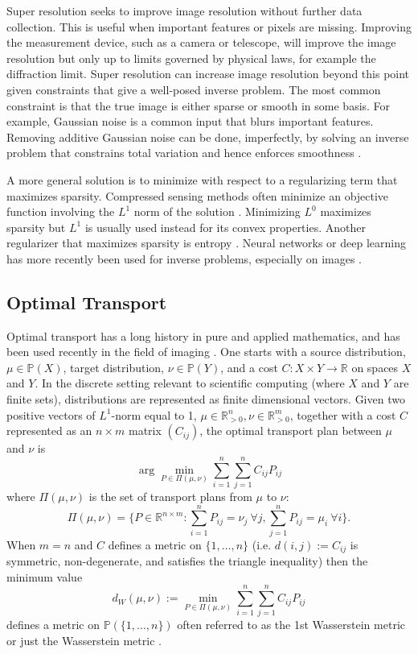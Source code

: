 \documentclass[conference]{IEEEtran}
\newcommand{\R}{{\mathbb{R}}}
\newcommand{\bbP}{{\mathbb{P}}}
\begin{document}
Super resolution seeks to improve image resolution without further data collection. This is useful when important features or pixels are missing. Improving the measurement device, such as a camera or telescope, will improve the image resolution but only up to limits governed by physical laws, for example the diffraction limit. Super resolution can increase image resolution beyond this point given constraints that give a well-posed inverse problem. The most common constraint is that the true image is either sparse or smooth in some basis. For example, Gaussian noise is a common input that blurs important features. Removing additive Gaussian noise can be done, imperfectly, by solving an inverse problem that constrains total variation and hence enforces smoothness \cite{ng}. 

A more general solution is to minimize with respect to a regularizing term that maximizes sparsity. Compressed sensing methods often minimize an objective function 
involving the $L^1$ norm of the solution \cite{candes}. Minimizing $L^0$ maximizes sparsity but $L^1$ is usually used instead for its convex properties. Another regularizer that maximizes sparsity is entropy \cite{gull, cornwell1985}. Neural networks or deep learning has more recently been used for inverse problems, especially on images \cite{ongie}.

\subsection{Optimal Transport}
Optimal transport has a long history in pure and applied mathematics, and has been used recently in the field of imaging \cite{cuturi}. One starts with a source distribution, $\mu\in\bbP(X)$, target distribution, $\nu\in\bbP(Y)$, and a cost $C:X \times Y \rightarrow \R$ on spaces $X$ and $Y$. In the discrete setting relevant to scientific computing (where $X$ and $Y$ are finite sets), distributions are represented as finite dimensional vectors.
Given two positive vectors of $L^1$-norm equal to 1, $\mu\in\R^n_{>0}, \nu \in \R^m_{>0}$, together with a cost $C$ represented as an $n\times m$ matrix $(C_{ij})$, the optimal transport plan between $\mu$ and $\nu$ is 
\begin{equation} \label{eq:OTPlan} 
    \arg\min_{P\in \Pi(\mu,\nu)} \sum_{i=1}^n \sum_{j=1}^n C_{ij} P_{ij} 
\end{equation}
where $\Pi(\mu,\nu)$ is the set of transport plans from $\mu$ to $\nu$:
$$ \Pi(\mu,\nu) = \{P\in\R^{n\times m}: \sum_{i=1}^n P_{ij} = \nu_j\ \forall j, \sum_{j=1}^n P_{ij} = \mu_i\ \forall i\}. $$
When $m=n$ and $C$ defines a metric on $\{1,\ldots,n\}$ (i.e. $d(i,j) := C_{ij}$ is symmetric, non-degenerate, and satisfies the triangle inequality) then the minimum value
\begin{equation} \label{eq:Wdist} 
    d_W(\mu,\nu) := \min_{P\in \Pi(\mu,\nu)} \sum_{i=1}^n \sum_{j=1}^n C_{ij} P_{ij} 
\end{equation}
defines a metric on $\bbP(\{1,\ldots,n\})$ often referred to as the 1st Wasserstein metric or just the Wasserstein metric \cite{villani}.
\end{document}
